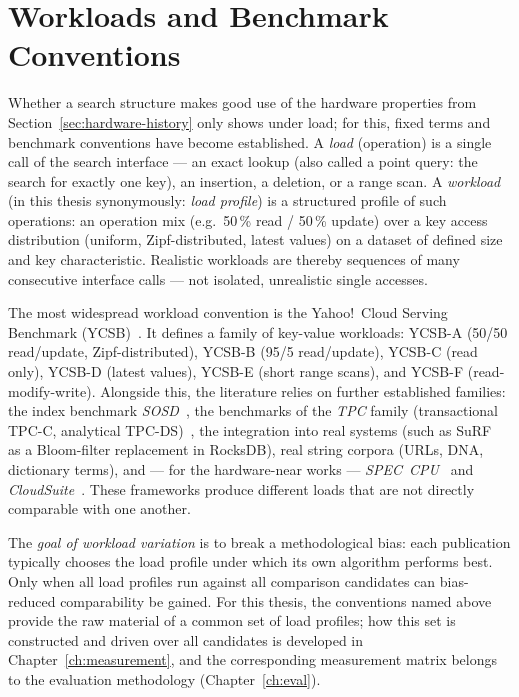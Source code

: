 \section{Workloads and Benchmark Conventions}\label{sec:workload-basics-known}
Whether a search structure makes good use of the hardware properties from
Section~\ref{sec:hardware-history} only shows under load; for this, fixed terms and benchmark
conventions have become established. A \emph{load} (operation) is a single call of the search
interface --- an exact lookup (also called a point query: the search for exactly one key), an
insertion, a deletion, or a range scan. A \emph{workload} (in this
thesis synonymously: \emph{load profile}) is a
structured profile of such operations: an operation mix (e.g.\ 50\,\% read / 50\,\% update) over a key
access distribution (uniform, Zipf-distributed, latest values) on a dataset of defined size and key
characteristic. Realistic workloads are thereby sequences of many consecutive interface calls
--- not isolated, unrealistic single accesses.

The most widespread workload convention is the Yahoo!\ Cloud Serving Benchmark
(YCSB)~\cite{cooper2010ycsb}. It defines a family of key-value workloads: YCSB-A (50/50 read/update,
Zipf-distributed), YCSB-B (95/5 read/update), YCSB-C (read only), YCSB-D (latest values), YCSB-E
(short range scans), and YCSB-F (read-modify-write). Alongside this, the literature relies on further
established families: the index benchmark \emph{SOSD}~\cite{kipf2019sosd}, the benchmarks
of the \emph{TPC} family (transactional TPC-C, analytical TPC-DS)~\cite{tpc_benchmarks}, the integration into real systems (such
as SuRF~\cite{zhang2018surf} as a Bloom-filter replacement in RocksDB), real string corpora (URLs, DNA,
dictionary terms), and --- for the hardware-near works --- \emph{SPEC~CPU}~\cite{spec_cpu2017} and
\emph{CloudSuite}~\cite{ferdman2012cloudsuite}. These frameworks produce different loads that are not
directly comparable with one another.

The \emph{goal of workload variation} is to break a methodological bias: each publication typically
chooses the load profile under which its own algorithm performs best. Only when all load profiles run
against all comparison candidates can bias-reduced comparability be gained. For this thesis, the
conventions named above provide the raw material of a common set of load profiles; how this set is
constructed and driven over all candidates is developed in Chapter~\ref{ch:measurement}, and the
corresponding measurement matrix belongs to the evaluation methodology (Chapter~\ref{ch:eval}).


